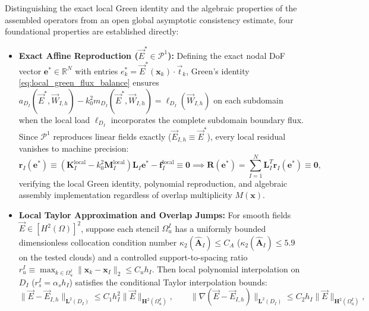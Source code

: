 \documentclass[VANCOUVER]{USG}
\begin{document}
Distinguishing the exact local Green identity and the algebraic properties of the assembled operators from an open global asymptotic consistency estimate, four foundational properties are established directly:
\begin{itemize}
    \item \textbf{Exact Affine Reproduction ($\vec{E}^* \in \mathcal{P}^1$):} Defining the exact nodal DoF vector $\mathbf{e}^* \in \mathbb{R}^N$ with entries $e_k^* = \vec{E}^*(\mathbf{x}_k) \cdot \vec{t}_k$, Green's identity \eqref{eq:local_green_flux_balance} ensures $a_{D_I}(\vec{E}^*, \vec{W}_{I,h}) - k_0^2 m_{D_I}(\vec{E}^*, \vec{W}_{I,h}) = \ell_{D_I}(\vec{W}_{I,h})$ on each subdomain when the local load $\ell_{D_I}$ incorporates the complete subdomain boundary flux. Since $\mathcal{P}^1$ reproduces linear fields exactly ($\vec{E}_{I,h} \equiv \vec{E}^*$), every local residual vanishes to machine precision:
          \begin{equation}
              \mathbf{r}_I(\mathbf{e}^*) \equiv (\mathbf{K}_I^{\mathrm{local}} - k_0^2 \mathbf{M}_I^{\mathrm{local}}) \mathbf{L}_I \mathbf{e}^* - \mathbf{f}_I^{\mathrm{local}} \equiv \mathbf{0} \implies \mathbf{R}(\mathbf{e}^*) = \sum_{I=1}^N \mathbf{L}_I^T \mathbf{r}_I(\mathbf{e}^*) \equiv \mathbf{0},
              \label{eq:subdomain_residual_zero}
          \end{equation}
          verifying the local Green identity, polynomial reproduction, and algebraic assembly implementation regardless of overlap multiplicity $M(\mathbf{x})$.
    \item \textbf{Local Taylor Approximation and Overlap Jumps:} For smooth fields $\vec{E} \in [H^2(\Omega)]^2$, suppose each stencil $\Omega_u^I$ has a uniformly bounded dimensionless collocation condition number $\kappa_2(\widehat{\mathbf{A}}_I) \le C_A$ ($\kappa_2(\widehat{\mathbf{A}}_I) \le 5.9$ on the tested clouds) and a controlled support-to-spacing ratio $r_u^I \equiv \max_{k \in \Omega_u^I} \|\mathbf{x}_k - \mathbf{x}_I\|_2 \le C_u h_I$. Then local polynomial interpolation on $D_I$ ($r_s^I = \alpha_s h_I$) satisfies the conditional Taylor interpolation bounds:
          \begin{equation}
              \|\vec{E} - \vec{E}_{I,h}\|_{\boldsymbol{L}^2(D_I)} \le C_1 h_I^2 \|\vec{E}\|_{\boldsymbol{H}^2(\Omega_u^I)}, \qquad
              \|\nabla(\vec{E} - \vec{E}_{I,h})\|_{\boldsymbol{L}^2(D_I)} \le C_2 h_I \|\vec{E}\|_{\boldsymbol{H}^2(\Omega_u^I)},
              \label{eq:local_taylor_bounds}
          \end{equation}

\end{itemize}
\end{document}
